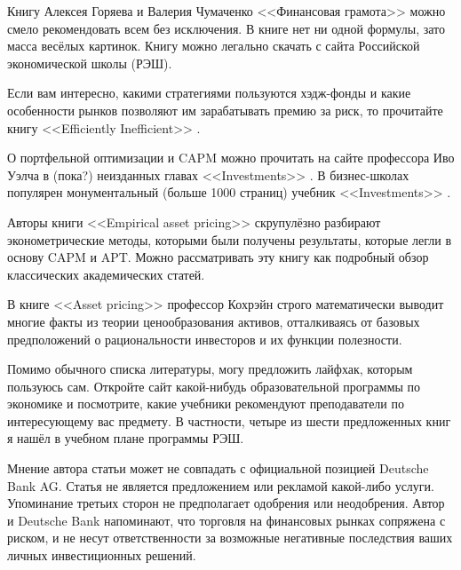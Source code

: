 Книгу Алексея Горяева и Валерия Чумаченко <<Финансовая грамота>> 
\cite{goryaev2009} можно смело рекомендовать всем без исключения. В книге нет ни 
одной формулы, зато масса весёлых картинок. Книгу можно легально скачать с сайта 
Российской экономической школы (РЭШ).

Если вам интересно, какими стратегиями пользуются хэдж-фонды и какие особенности 
рынков позволяют им зарабатывать премию за риск, то прочитайте книгу 
<<Efficiently Inefficient>> \cite{pedersen2015efficiently}.

О портфельной оптимизации и CAPM можно прочитать на сайте профессора Иво Уэлча в 
(пока?) неизданных главах <<Investments>> \cite{welch}. В бизнес-школах 
популярен монументальный (больше 1000 страниц) учебник <<Investments>> 
\cite{bodie2014investments}.

Авторы книги <<Empirical asset pricing>> \cite{bali2016empirical} скрупулёзно 
разбирают эконометрические методы, которыми были получены результаты, которые 
легли в основу CAPM и APT. Можно рассматривать эту книгу как подробный обзор 
классических академических статей.

В книге <<Asset pricing>> \cite{cochrane2005asset} профессор Кохрэйн строго 
математически выводит многие факты из теории ценообразования активов, 
отталкиваясь от базовых предположений о рациональности инвесторов и их 
функции полезности.

Помимо обычного списка литературы, могу предложить лайфхак, которым пользуюсь 
сам. Откройте сайт какой-нибудь образовательной программы по экономике и 
посмотрите, какие учебники рекомендуют преподаватели по интересующему вас 
предмету. В частности, четыре из шести предложенных книг я нашёл в учебном 
плане программы
 РЭШ.


Мнение автора статьи может не совпадать с официальной позицией Deutsche Bank 
AG. Статья не является предложением или рекламой какой-либо услуги. Упоминание
третьих сторон не предполагает одобрения или неодобрения. Автор и Deutsche Bank
напоминают, что торговля на финансовых рынках сопряжена с риском, и не несут
ответственности за возможные негативные последствия ваших личных инвестиционных
решений.

\en{
\printbibliography[title = \ru{Список литературы}]
}
\printendnotes

